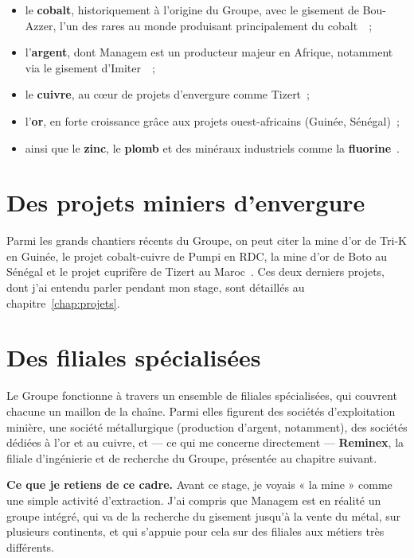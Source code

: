 \documentclass[12pt,a4paper,oneside]{report}
\begin{document}
\begin{itemize}
\item le \textbf{cobalt}, historiquement à l'origine du Groupe, avec le gisement de Bou-Azzer, l'un des rares au monde produisant principalement du cobalt~\cite{ecofin_managem}~;
\item l'\textbf{argent}, dont Managem est un producteur majeur en Afrique, notamment via le gisement d'Imiter~\cite{ecofin_managem}~;
\item le \textbf{cuivre}, au cœur de projets d'envergure comme Tizert~;
\item l'\textbf{or}, en forte croissance grâce aux projets ouest-africains (Guinée, Sénégal)~;
\item ainsi que le \textbf{zinc}, le \textbf{plomb} et des minéraux industriels comme la \textbf{fluorine}~\cite{morocco_minerals}.
\end{itemize}

\section{Des projets miniers d'envergure}

Parmi les grands chantiers récents du Groupe, on peut citer la mine d'or de Tri-K en Guinée, le projet cobalt-cuivre de Pumpi en RDC, la mine d'or de Boto au Sénégal et le projet cuprifère de Tizert au Maroc~\cite{ecofin_managem}. Ces deux derniers projets, dont j'ai entendu parler pendant mon stage, sont détaillés au chapitre~\ref{chap:projets}.

\section{Des filiales spécialisées}

Le Groupe fonctionne à travers un ensemble de filiales spécialisées, qui couvrent chacune un maillon de la chaîne. Parmi elles figurent des sociétés d'exploitation minière, une société métallurgique (production d'argent, notamment), des sociétés dédiées à l'or et au cuivre, et --- ce qui me concerne directement --- \textbf{Reminex}, la filiale d'ingénierie et de recherche du Groupe, présentée au chapitre suivant.

\begin{presente}
\textbf{Ce que je retiens de ce cadre.} Avant ce stage, je voyais « la mine » comme une simple activité d'extraction. J'ai compris que Managem est en réalité un groupe intégré, qui va de la recherche du gisement jusqu'à la vente du métal, sur plusieurs continents, et qui s'appuie pour cela sur des filiales aux métiers très différents.
\end{presente}
\end{document}
